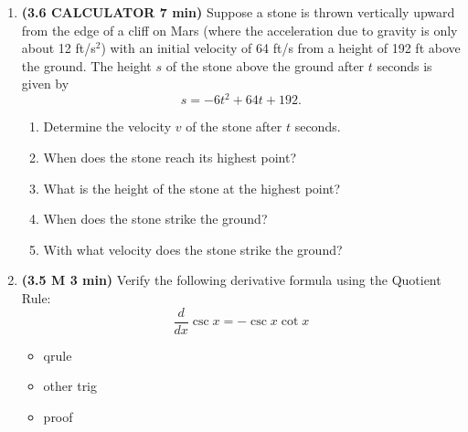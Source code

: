 \documentclass[12pt]{article}
\begin{document}
\begin{enumerate}[1.]
\item {\bf (3.6 CALCULATOR 7 min)} Suppose a stone is thrown vertically upward from the edge of a cliff on Mars (where the acceleration due to gravity is only about 12 ft/s$^\text{2}$) with an initial velocity of 64 ft/s from a height of 192 ft above the ground.  The height $s$ of the stone above the ground after $t$ seconds is given by 
\[
s=-6t^2+64t+192.
\] 
\begin{enumerate}
	\item Determine the velocity $v$ of the stone after $t$ seconds.
	
	\item When does the stone reach its highest point?
	
	\item What is the height of the stone at the highest point?
	
	\item When does the stone strike the ground?
	
	\item With what velocity does the stone strike the ground?
\end{enumerate}

\item {\bf (3.5 M 3 min)} Verify the following derivative formula using the Quotient Rule:
\[
\frac{d}{dx}\csc x=-\csc x\cot x
\]
{\bf\begin{itemize}
\item qrule
\item other trig
\item proof
\end{itemize}}


\end{enumerate}
\end{document}
